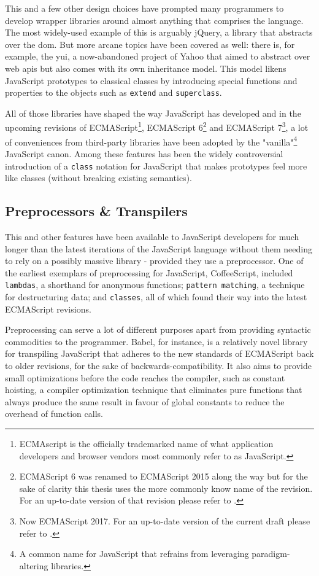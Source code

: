 \documentclass[oneside,11pt,xetex]{scrbook}
\begin{document}
This and a few other design choices have prompted many programmers to develop
wrapper libraries around almost anything that comprises the language. The most widely-used
example of this is arguably jQuery, a library that abstracts over the \gls{dom}.
But more arcane topics have been covered as well: there is, for example, the \gls{yui}, a now-abandoned
project of Yahoo that aimed to abstract over web \glspl{api} but also comes with
its own inheritance model. This model likens JavaScript prototypes to classical classes by
introducing special functions and properties to the objects such as \texttt{extend}
and \texttt{superclass}.

All of those libraries have shaped the way JavaScript has developed and in the
upcoming revisions of ECMAScript\footnote{ECMAscript is the officially trademarked
name of what application developers and browser vendors most commonly refer to as
JavaScript.}, ECMAScript 6\footnote{ECMAScript 6 was renamed to ECMAScript 2015
along the way but for the sake of clarity this thesis uses the more commonly
know name of the revision. For an up-to-date version of that revision please
refer to \parencite{ECMA6}.} and ECMAScript 7\footnote{Now ECMAScript 2017. For
an up-to-date version of the current draft please refer to \parencite{ECMA7}.}, a
lot of conveniences from third-party libraries have been adopted by the
"vanilla"\footnote{A common name for JavaScript that refrains from leveraging
paradigm-altering libraries.} JavaScript canon.
Among these features has been the widely controversial introduction of a \texttt{class}
notation for JavaScript that makes prototypes feel more like classes (without
breaking existing semantics).

\subsection{Preprocessors \& Transpilers}
\label{pretrans}

This and other features have been available to JavaScript developers for much
longer than the latest iterations of the JavaScript language without them needing
to rely on a possibly massive library - provided they use a preprocessor.
One of the earliest exemplars of preprocessing for JavaScript, CoffeeScript, included
\texttt{lambdas}, a shorthand for anonymous functions; \texttt{pattern matching},
a technique for destructuring data; and \texttt{classes}, all of which found
their way into the latest ECMAScript revisions.

Preprocessing can serve a lot of different purposes apart from providing
syntactic commodities to the programmer. Babel, for instance, is a relatively
novel library for transpiling JavaScript that adheres to the new standards
of ECMAScript back to older revisions, for the sake of backwards-compatibility.
It also aims to provide small optimizations before the code reaches the compiler,
such as constant hoisting, a compiler optimization technique that eliminates
pure functions that always produce the same result in favour of global constants
to reduce the overhead of function calls.
\end{document}
